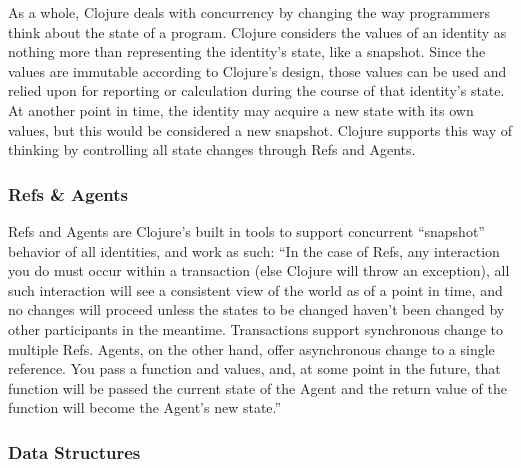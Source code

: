     As a whole, Clojure deals with concurrency by changing the way programmers think about the state of a program. Clojure considers the values of an identity as nothing more than representing the identity's state, like a snapshot. Since the values are immutable according to Clojure's design, those values can be used and relied upon for reporting or calculation during the course of that identity's state. At another point in time, the identity may acquire a new state with its own values, but this would be considered a new snapshot. Clojure supports this way of thinking by controlling all state changes through Refs and Agents.

\subsubsection{Refs \& Agents}

    Refs and Agents are Clojure's built in tools to support concurrent ``snapshot'' behavior of all identities, and work as such: ``In the case of Refs, any interaction you do must occur within a transaction (else Clojure will throw an exception), all such interaction will see a consistent view of the world as of a point in time, and no changes will proceed unless the states to be changed haven’t been changed by other participants in the meantime. Transactions support synchronous change to multiple Refs. Agents, on the other hand, offer asynchronous change to a single reference. You pass a function and values, and, at some point in the future, that function will be passed the current state of the Agent and the return value of the function will become the Agent’s new state.'' \cite{website:clojure-concurrency}
    
    

\subsubsection{Data Structures}
    
